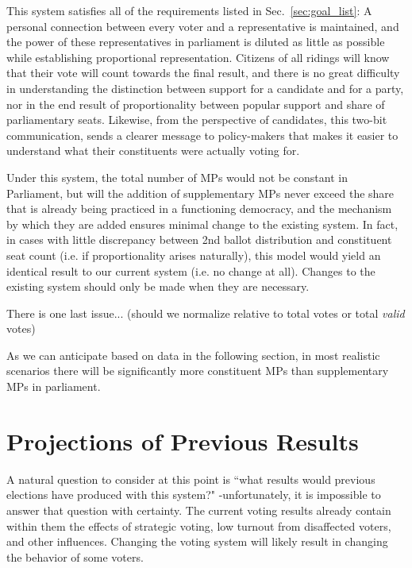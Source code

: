\documentclass[DIV=calc, paper=a4, fontsize=11pt, twocolumn]{scrartcl}	 %
\begin{document}
This system satisfies all of the requirements listed in Sec.~\ref{sec:goal_list}: A personal connection between every voter and a representative is maintained, and the power of these representatives in parliament is diluted as little as possible while establishing proportional representation. 
Citizens of all ridings will know that their vote will count towards the final result, and there is no great difficulty in understanding the  distinction between support for a candidate and for a party, nor in the end result of proportionality between popular support and share of parliamentary seats.
Likewise, from the perspective of candidates, this two-bit communication, sends a clearer message to policy-makers that makes it easier to understand what their constituents were actually voting for.

Under this system, the total number of MPs would not be constant in Parliament, but will the addition of supplementary MPs never exceed the share that is already being practiced in a functioning democracy, and the mechanism by which they are added ensures minimal change to the existing system.
In fact, in cases with little discrepancy between 2nd ballot distribution and constituent seat count (i.e. if proportionality arises naturally), this model would yield an identical result to our current system (i.e. no change at all). Changes to the existing system should only be made when they are necessary.


There is one last issue... (should we normalize relative to total votes or total \emph{valid} votes)

As we can anticipate based on data in the following section, in most realistic scenarios there will be significantly more constituent MPs than supplementary MPs in parliament. 

\section{Projections of Previous Results}

A natural question to consider at this point is ``what results would previous elections have produced with this system?" \--unfortunately, it is impossible to answer that question with certainty. 
The current voting results already contain within them the effects of strategic voting, low turnout from disaffected voters, and other influences. Changing the voting system will likely result in changing the behavior of some voters.
\end{document}
